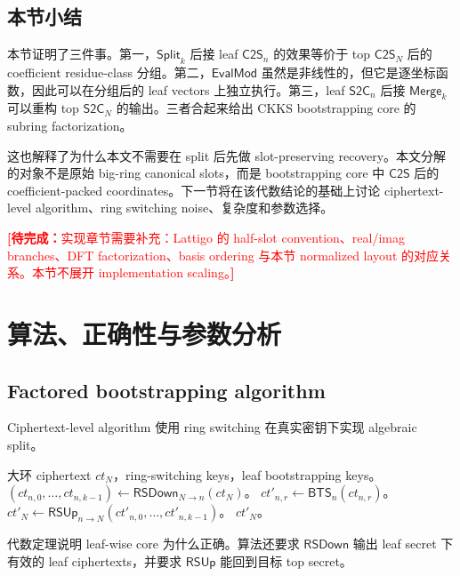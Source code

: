 \documentclass[UTF8,11pt]{article}
\newcommand{\todo}[1]{\textcolor{red}{\textbf{[待完成：}#1\textbf{]}}}
\newcommand{\Split}{\mathsf{Split}}
\newcommand{\Merge}{\mathsf{Merge}}
\newcommand{\RSDown}{\mathsf{RSDown}}
\newcommand{\RSUp}{\mathsf{RSUp}}
\newcommand{\CtwoS}{\mathsf{C2S}}
\newcommand{\StwoC}{\mathsf{S2C}}
\newcommand{\EvalMod}{\mathsf{EvalMod}}
\newcommand{\BTS}{\mathsf{BTS}}
\theoremstyle{definition}
\theoremstyle{plain}
\begin{document}
\subsection{本节小结}
\label{subsec:main-theory-summary}

本节证明了三件事。第一，\(\Split_k\) 后接 leaf \(\CtwoS_n\) 的效果等价于 top \(\CtwoS_N\) 后的 coefficient residue-class 分组。第二，\(\EvalMod\) 虽然是非线性的，但它是逐坐标函数，因此可以在分组后的 leaf vectors 上独立执行。第三，leaf \(\StwoC_n\) 后接 \(\Merge_k\) 可以重构 top \(\StwoC_N\) 的输出。三者合起来给出 CKKS bootstrapping core 的 subring factorization。

这也解释了为什么本文不需要在 split 后先做 slot-preserving recovery。本文分解的对象不是原始 big-ring canonical slots，而是 bootstrapping core 中 \(\CtwoS\) 后的 coefficient-packed coordinates。下一节将在该代数结论的基础上讨论 ciphertext-level algorithm、ring switching noise、复杂度和参数选择。

\todo{实现章节需要补充：Lattigo 的 half-slot convention、real/imag branches、DFT factorization、basis ordering 与本节 normalized layout 的对应关系。本节不展开 implementation scaling。}

\section{算法、正确性与参数分析}

\subsection{Factored bootstrapping algorithm}
Ciphertext-level algorithm 使用 ring switching 在真实密钥下实现 algebraic split。

\begin{algorithm}[h]
\caption{Subring-factored CKKS bootstrapping}
\begin{algorithmic}[1]
\Require 大环 ciphertext $ct_N$，ring-switching keys，leaf bootstrapping keys。
\State $(ct_{n,0},\ldots,ct_{n,k-1})\gets\RSDown_{N\to n}(ct_N)$。
    \State $ct'_{n,r}\gets\BTS_n(ct_{n,r})$。
\EndFor
\State $ct'_N\gets\RSUp_{n\to N}(ct'_{n,0},\ldots,ct'_{n,k-1})$。
\State \Return $ct'_N$。
\end{algorithmic}
\end{algorithm}

代数定理说明 leaf-wise core 为什么正确。算法还要求 $\RSDown$ 输出 leaf secret 下有效的 leaf ciphertexts，并要求 $\RSUp$ 能回到目标 top secret。
\end{document}
